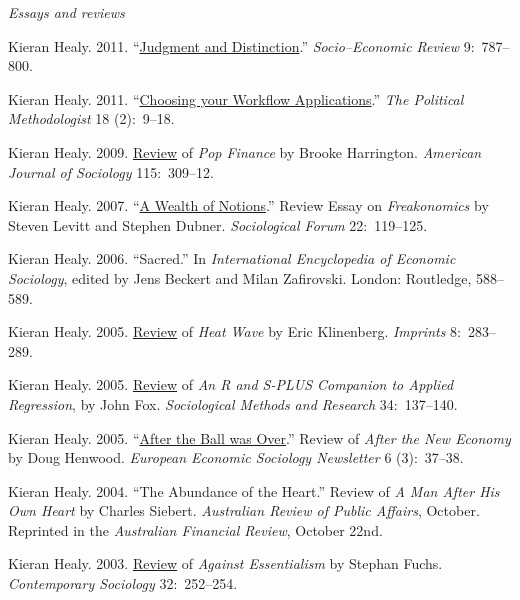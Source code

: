 \documentclass[11pt,article,oneside]{memoir}
\begin{document}
\bigskip 

\noindent\emph{Essays and reviews \vspace{0.05in}}


\ind Kieran Healy. 2011. ``\href{http://www.kieranhealy.org/files/reviews/karpik-review.pdf}{Judgment and Distinction}.'' \emph{Socio--Economic Review} 9:~787--800. 

\ind Kieran Healy. 2011. ``\href{http://polmeth.wustl.edu/methodologist/tpm_v18_n2.pdf}{Choosing your Workflow Applications}.'' \emph{The Political Methodologist} 18 (2):~9--18. 

\ind Kieran Healy. 2009. \href{http://www.journals.uchicago.edu/doi/pdf/10.1086/605757}{Review} of \emph{Pop Finance} by Brooke Harrington. \emph{American Journal of Sociology} 115:~309--12.

\ind Kieran Healy. 2007. ``\href{http://www.kieranhealy.org/files/reviews/socforum-article.pdf}{A Wealth of Notions}.'' Review
Essay on \emph{Freakonomics} by Steven Levitt and Stephen Dubner. \emph{Sociological Forum} 22:~119--125. 

\ind  Kieran Healy. 2006. ``Sacred.'' In \emph{International Encyclopedia of Economic Sociology}, edited by Jens Beckert and Milan Zafirovski. London: Routledge, 588--589. 

\ind  Kieran Healy. 2005. \href{http://www.kieranhealy.org/files/reviews/klinenberg.pdf}{Review} of \emph{Heat Wave} by Eric Klinenberg. \emph{Imprints} 8:~283--289.

\ind  Kieran Healy. 2005. \href{http://www.kieranhealy.org/files/reviews/fox.pdf}{Review} of \emph{An R and S-PLUS Companion to Applied Regression}, by John Fox. \emph{Sociological Methods and Research} 34:~137--140.

\ind  Kieran Healy. 2005. ``\href{http://www.kieranhealy.org/files/reviews/henwood.pdf}{After the Ball was Over}.'' Review of \emph{After the New
  Economy} by Doug Henwood. \emph{European Economic Sociology Newsletter} 6 (3):~37--38.

\ind  Kieran Healy. 2004. ``The Abundance of the Heart.'' Review of \emph{A Man After His Own Heart} by Charles
Siebert. \emph{Australian Review of Public Affairs}, October. Reprinted in the
\emph{Australian Financial Review}, October 22nd.

\ind  Kieran Healy. 2003. \href{http://links.jstor.org/sici?sici=0094-3061%28200303%2932%3A2%3C252%3AAEATOC%3E2.0.CO%3B2-F}{Review} of \emph{Against Essentialism} by Stephan Fuchs.
\emph{Contemporary Sociology} 32:~252--254.
\end{document}
